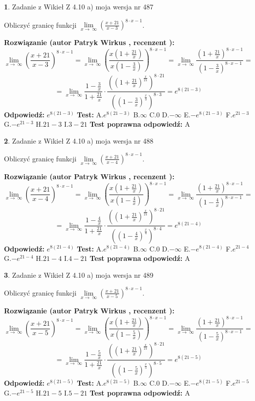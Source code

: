 \documentclass[12pt, a4paper]{article}
\theoremstyle{definition} %
\newtheorem{zad}{}
\newcommand{\zadStart}[1]{\begin{zad}#1\newline}
\newcommand{\zadStop}{\end{zad}}
\newcommand{\rozwStart}[2]{\noindent \textbf{Rozwiązanie (autor #1 , recenzent #2): }\newline}
\newcommand{\rozwStop}{\newline}
\newcommand{\odpStart}{\noindent \textbf{Odpowiedź:}\newline}
\newcommand{\odpStop}{\newline}
\newcommand{\testStart}{\noindent \textbf{Test:}\newline}
\newcommand{\testStop}{\newline}
\newcommand{\kluczStart}{\noindent \textbf{Test poprawna odpowiedź:}\newline}
\newcommand{\kluczStop}{\newline}
\begin{document}
\zadStart{Zadanie z Wikieł Z 4.10 a) moja wersja nr 487}


Obliczyć granicę funkcji  $\lim\limits_{x\to\ \infty}(\frac{x+21}{x-3})^{8\cdot x-1}$.
\zadStop
\rozwStart{Patryk Wirkus}{}
$$\lim\limits_{x\to\ \infty}(\frac{x+21}{x-3})^{8\cdot x-1} = \lim\limits_{x\to\ \infty}(\frac{x(1+\frac{21}{x})}{x(1-\frac{3}{x})})^{8\cdot x-1}=\lim\limits_{x\to\ \infty}\frac{(1+\frac{21}{x})^{8\cdot x-1}}{(1-\frac{3}{x})^{8\cdot x-1}}=$$
$$=\lim\limits_{x\to\ \infty}\frac{1-\frac{3}{x}}{1+\frac{21}{x}}\cdot\frac{((1+\frac{21}{x})^{\frac{x}{21}})^{8\cdot21}}{((1-\frac{3}{x})^{\frac{x}{3}})^{8\cdot3}}=e^{8(21-3)}$$
\rozwStop
\odpStart
$e^{8(21-3)}$
\odpStop
\testStart
A.$e^{8(21-3)}$ B.$\infty$ C.$0$ D.$-\infty$ E.$-e^{8(21-3)}$
F.$e^{21-3}$ G.$-e^{21-3}$
H.$21-3$
I.$3-21$
\testStop
\kluczStart
A
\kluczStop



\zadStart{Zadanie z Wikieł Z 4.10 a) moja wersja nr 488}


Obliczyć granicę funkcji  $\lim\limits_{x\to\ \infty}(\frac{x+21}{x-4})^{8\cdot x-1}$.
\zadStop
\rozwStart{Patryk Wirkus}{}
$$\lim\limits_{x\to\ \infty}(\frac{x+21}{x-4})^{8\cdot x-1} = \lim\limits_{x\to\ \infty}(\frac{x(1+\frac{21}{x})}{x(1-\frac{4}{x})})^{8\cdot x-1}=\lim\limits_{x\to\ \infty}\frac{(1+\frac{21}{x})^{8\cdot x-1}}{(1-\frac{4}{x})^{8\cdot x-1}}=$$
$$=\lim\limits_{x\to\ \infty}\frac{1-\frac{4}{x}}{1+\frac{21}{x}}\cdot\frac{((1+\frac{21}{x})^{\frac{x}{21}})^{8\cdot21}}{((1-\frac{4}{x})^{\frac{x}{4}})^{8\cdot4}}=e^{8(21-4)}$$
\rozwStop
\odpStart
$e^{8(21-4)}$
\odpStop
\testStart
A.$e^{8(21-4)}$ B.$\infty$ C.$0$ D.$-\infty$ E.$-e^{8(21-4)}$
F.$e^{21-4}$ G.$-e^{21-4}$
H.$21-4$
I.$4-21$
\testStop
\kluczStart
A
\kluczStop



\zadStart{Zadanie z Wikieł Z 4.10 a) moja wersja nr 489}


Obliczyć granicę funkcji  $\lim\limits_{x\to\ \infty}(\frac{x+21}{x-5})^{8\cdot x-1}$.
\zadStop
\rozwStart{Patryk Wirkus}{}
$$\lim\limits_{x\to\ \infty}(\frac{x+21}{x-5})^{8\cdot x-1} = \lim\limits_{x\to\ \infty}(\frac{x(1+\frac{21}{x})}{x(1-\frac{5}{x})})^{8\cdot x-1}=\lim\limits_{x\to\ \infty}\frac{(1+\frac{21}{x})^{8\cdot x-1}}{(1-\frac{5}{x})^{8\cdot x-1}}=$$
$$=\lim\limits_{x\to\ \infty}\frac{1-\frac{5}{x}}{1+\frac{21}{x}}\cdot\frac{((1+\frac{21}{x})^{\frac{x}{21}})^{8\cdot21}}{((1-\frac{5}{x})^{\frac{x}{5}})^{8\cdot5}}=e^{8(21-5)}$$
\rozwStop
\odpStart
$e^{8(21-5)}$
\odpStop
\testStart
A.$e^{8(21-5)}$ B.$\infty$ C.$0$ D.$-\infty$ E.$-e^{8(21-5)}$
F.$e^{21-5}$ G.$-e^{21-5}$
H.$21-5$
I.$5-21$
\testStop
\kluczStart
A
\kluczStop
\end{document}
